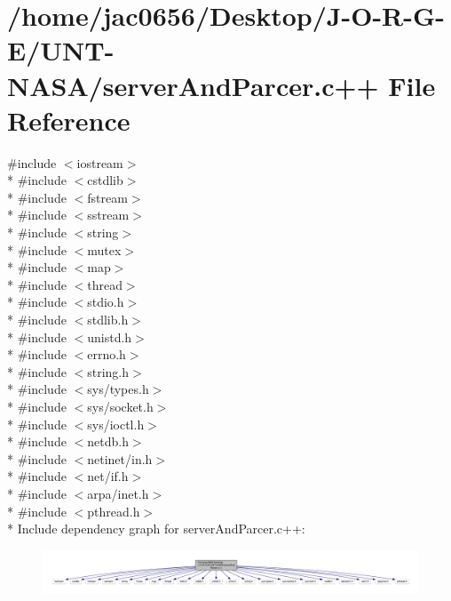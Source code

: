 \hypertarget{serverAndParcer_8c_09_09}{}\section{/home/jac0656/\+Desktop/\+J-\/\+O-\/\+R-\/\+G-\/\+E/\+U\+N\+T-\/\+N\+A\+S\+A/server\+And\+Parcer.c++ File Reference}
\label{serverAndParcer_8c_09_09}
{\ttfamily \#include $<$iostream$>$}\\*
{\ttfamily \#include $<$cstdlib$>$}\\*
{\ttfamily \#include $<$fstream$>$}\\*
{\ttfamily \#include $<$sstream$>$}\\*
{\ttfamily \#include $<$string$>$}\\*
{\ttfamily \#include $<$mutex$>$}\\*
{\ttfamily \#include $<$map$>$}\\*
{\ttfamily \#include $<$thread$>$}\\*
{\ttfamily \#include $<$stdio.\+h$>$}\\*
{\ttfamily \#include $<$stdlib.\+h$>$}\\*
{\ttfamily \#include $<$unistd.\+h$>$}\\*
{\ttfamily \#include $<$errno.\+h$>$}\\*
{\ttfamily \#include $<$string.\+h$>$}\\*
{\ttfamily \#include $<$sys/types.\+h$>$}\\*
{\ttfamily \#include $<$sys/socket.\+h$>$}\\*
{\ttfamily \#include $<$sys/ioctl.\+h$>$}\\*
{\ttfamily \#include $<$netdb.\+h$>$}\\*
{\ttfamily \#include $<$netinet/in.\+h$>$}\\*
{\ttfamily \#include $<$net/if.\+h$>$}\\*
{\ttfamily \#include $<$arpa/inet.\+h$>$}\\*
{\ttfamily \#include $<$pthread.\+h$>$}\\*
Include dependency graph for server\+And\+Parcer.\+c++\+:\nopagebreak
\begin{figure}[H]
\begin{center}
\leavevmode
\includegraphics[width=350pt]{serverAndParcer_8c_09_09__incl}
\end{center}
\end{figure}
